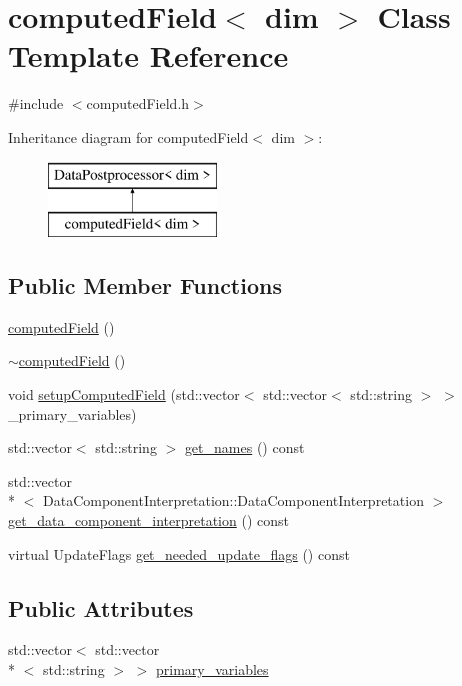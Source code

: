 \section{computed\-Field$<$ dim $>$ Class Template Reference}
\label{classcomputed_field}


{\ttfamily \#include $<$computed\-Field.\-h$>$}

Inheritance diagram for computed\-Field$<$ dim $>$\-:\begin{figure}[H]
\begin{center}
\leavevmode
\includegraphics[height=2.000000cm]{classcomputed_field}
\end{center}
\end{figure}
\subsection*{Public Member Functions}
\begin{DoxyCompactItemize}
\item 
\hyperlink{classcomputed_field_ab4f4245d1d8abf1daeedbf2784d6c42a}{computed\-Field} ()
\item 
\hyperlink{classcomputed_field_a23cfaecc3df333ef21739f65a72c81ff}{$\sim$computed\-Field} ()
\item 
void \hyperlink{classcomputed_field_ac6ff6cde468abcaa2ee7c9c4fd6b9047}{setup\-Computed\-Field} (std\-::vector$<$ std\-::vector$<$ std\-::string $>$ $>$ \-\_\-primary\-\_\-variables)
\item 
std\-::vector$<$ std\-::string $>$ \hyperlink{classcomputed_field_a72dd7a460e7aad3475596763311bfd81}{get\-\_\-names} () const 
\item 
std\-::vector\\*
$<$ Data\-Component\-Interpretation\-::\-Data\-Component\-Interpretation $>$ \hyperlink{classcomputed_field_abd61a7ab92eda357fabe2df46e86cf3f}{get\-\_\-data\-\_\-component\-\_\-interpretation} () const 
\item 
virtual Update\-Flags \hyperlink{classcomputed_field_a13b226a0ef121beb6ea2b7c3a4275218}{get\-\_\-needed\-\_\-update\-\_\-flags} () const 
\end{DoxyCompactItemize}
\subsection*{Public Attributes}
\begin{DoxyCompactItemize}
\item 
std\-::vector$<$ std\-::vector\\*
$<$ std\-::string $>$ $>$ \hyperlink{classcomputed_field_a4933860ad833b7b9bd2b8effee5c36d6}{primary\-\_\-variables}
\end{DoxyCompactItemize}


